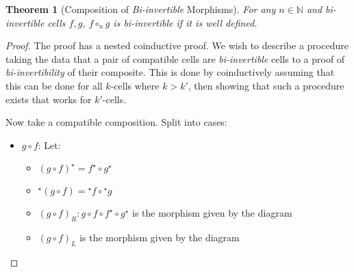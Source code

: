 \documentclass{article}
\newtheorem{theorem}{Theorem}
\theoremstyle{definition}
\theoremstyle{examplestyle}
\newcommand{\linv}[1]{{}^\star\!#1}
\newcommand{\rinv}[1]{#1^\star}
\begin{document}
\begin{theorem}[Composition of \emph{Bi-invertible} Morphisms]
  For any \(n \in \mathbb{N}\) and \emph{bi-invertible} cells \(f,g\), \(f \circ_n g\) is \emph{bi-invertible} if it is well defined.
\end{theorem}
\begin{proof}
  The proof has a nested coinductive proof. We wish to describe a procedure taking the data that a pair of compatible cells are \emph{bi-invertible} cells to a proof of \emph{bi-invertibility} of their composite. This is done by coinductively assuming that this can be done for all \(k\)-cells where \(k>k'\), then showing that such a procedure exists that works for \(k'\)-cells.

  Now take a compatible composition. Split into cases:
  \begin{itemize}
  \item \(g \circ f\): Let:
    \begin{itemize}
      \item \(\rinv {(g \circ f)} = \rinv f \circ \rinv g\)
      \item \(\linv {(g \circ f)} = \linv f \circ \linv g\)
      \item \((g \circ f)_R : g \circ f \circ \rinv f \circ \rinv g\) is the morphism given by the diagram
        \begin{center}
        \end{center}
      \item \((g \circ f)_L\) is the morphism given by the diagram
        \begin{center}
          \begin{tikzpicture}

\end{tikzpicture}
\end{center}
\end{itemize}
\end{itemize}
\end{proof}
\end{document}
